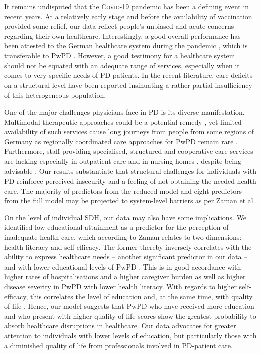 \documentclass[a4paper,oneside,11pt,english]{scrartcl}
\begin{document}
It remains undisputed that the \textsc{Covid}-19 pandemic has been a defining event in recent years. At a relatively early stage and before the availability of vaccination provided some relief, our data reflect people's unbiased and acute concerns regarding their own healthcare. Interestingly, a good overall performance has been attested to the German healthcare system during the pandemic \cite{10665-341674}, which is transferable to Pw\textsc{PD} \cite{frundt2022impact}. However, a good testimony for a healthcare system should not be equated with an adequate range of services, especially when it comes to very specific needs of \textsc{PD}-patients. In the recent literature, care deficits on a structural level have been reported insinuating a rather partial insufficiency \cite{richter2019dynamics,van2020building, prell2020specialized, deuschl2016s3} of this heterogeneous population.

One of the major challenges physicians face in \textsc{PD} is its diverse manifestation. Multimodal therapeutic approaches could be a potential remedy \cite{richter2019dynamics}, yet limited availability of such services cause long journeys from people from some regions of Germany \cite{richter2019dynamics} as regionally coordinated care approaches for Pw\textsc{PD} remain rare \cite{van2020building}. Furthermore, staff providing specialised, structured and cooperative care services are lacking especially in outpatient care and in nursing homes \cite{prell2020specialized}, despite being advisable \cite{radder2020recommendations, deuschl2016s3}. Our results substantiate that structural challenges for individuals with \textsc{PD} reinforce perceived insecurity and a feeling of not obtaining the needed health care. The majority of predictors from the reduced model and eight predictors from the full model may be projected to system-level barriers as per Zaman et al.  

On the level of individual SDH, our data may also have some implications. We identified low educational attainment as a predictor for the perception of inadequate health care, which according to Zaman \cite{zaman2021barriers} relates to two dimensions: health literacy and self-efficacy. The former thereby inversely correlates with the ability to express healthcare needs \cite{davis2003variability, hurt2019barriers} -- another significant predictor in our data -- and with lower educational levels of Pw\textsc{PD} \cite{fleisher2016associations}. This is in good accordance with higher rates of hospitalisations and a higher caregiver burden \cite{fleisher2016associations} as well as higher disease severity \cite{fleisher2016associations} in Pw\textsc{PD} with lower health literacy. With regards to higher self-efficacy, this correlates the level of education\cite{lim2020factors} and, at the same time, with quality of life \cite{rostagni2022gratitude, lim2020factors}. Hence, our model suggests that Pw\textsc{PD} who have received more education and who present with higher quality of life scores show the greatest probability to absorb healthcare disruptions in healthcare. Our data advocates for greater attention to individuals with lower levels of education, but particularly those with a diminished quality of life from professionals involved in \textsc{PD}-patient care.
\end{document}
